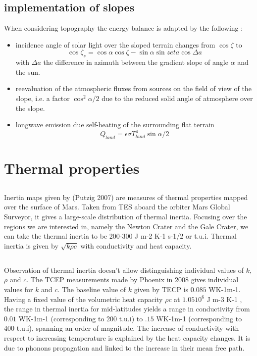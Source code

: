\documentclass{report}
\begin{document}
    \subsection{implementation of slopes}
    When considering topography the energy balance is adapted by the following :
    \begin{itemize}
        \item incidence angle of solar light over the sloped terrain changes from $\cos{\zeta} $ to $$\cos{ \zeta_s} = \cos{ \alpha} \cos{ \zeta} - \sin{ \alpha} \sin{zeta}\cos{\Delta a}$$
        with $\Delta a$ the difference in azimuth between the gradient slope of angle $\alpha$ and the sun. 
        \item reevaluation of the atmospheric fluxes from sources on the field of view of the slope, i.e. a factor $\cos^2{\alpha/2}$ due to the reduced solid angle of atmosphere over the slope.  
        \item longwave emission due self-heating of the surrounding flat terrain 
       \[Q_{land} = \epsilon \sigma T_{land}^4\sin{\alpha/2}\]
    \end{itemize}{}

\section{Thermal properties}
    \subsection{}
    Inertia maps given by (Putzig 2007) are measures of thermal properties mapped over the surface of Mars. Taken from TES aboard the orbiter Mars Global Surveyor, it gives a large-scale distribution of thermal inertia. 
    Focusing over the regions we are interested in, namely the Newton Crater and the Gale Crater, we can take the thermal inertia to be 200-300 J m-2 K-1 s-1/2 or t.u.i. 
    Thermal inertia is given by $\sqrt{k\rho c}$ with conductivity and heat capacity. 
    \subsection{}
    Observation of thermal inertia doesn't allow distinguishing individual values of $k$, $\rho$ and $c$. The TCEP measurements made by Phoenix in 2008 gives individual values for $k$ and $c$. 
    The baseline value of $k$ given by TECP is $0.085$ WK-1m-1. 
    Having a fixed value of the volumetric heat capacity $\rho c$ at $1.05 10^6$ J m-3 K-1 , the range in thermal inertia for mid-latitudes yields a range in conductivity from $0.01$ WK-1m-1 (corresponding to 200 t.u.i) to $.15$ WK-1m-1 (corresponding to 400 t.u.i), spanning an order of magnitude.
    The increase of conductivity with respect to increasing temperature is explained by the heat capacity changes. It is due to phonons propagation and linked to the increase in their mean free path. 
    
\end{document}
